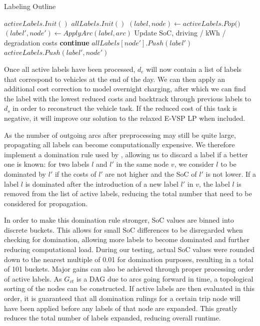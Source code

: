 \documentclass[]{article}
\begin{document}
\begin{algorithm}
\caption{Labeling Outline}\label{alg:evsp-labeling}
\begin{algorithmic}
\State $activeLabels.Init()$ 
\State $allLabels.Init()$ 
    \State $(label, node) \gets \textit{activeLabels.Pop()}$
        \State $(label', node') \gets ApplyArc(label, arc)$ \Comment Update SoC, driving / kWh / degradation costs
          \textbf{continue}
        \EndIf
        \State $allLabels[node'].Push(label')$
          \State $activeLabels.Push(label', node')$
        \EndIf
    \EndFor
\EndWhile
\end{algorithmic}
\end{algorithm}
Once all active labels have been processed, $d_e$ will now contain a list of labels that correspond to vehicles at the end of the day. We can then apply an additional cost correction to model overnight charging, after which we can find the label with the lowest reduced costs and backtrack through previous labels to $d_s$ in order to reconstruct the vehicle task. If the reduced cost of this task is negative, it will improve our solution to the relaxed E-VSP LP when included. 

As the number of outgoing arcs after preprocessing may still be quite large, propagating all labels can become computationally expensive. We therefore implement a domination rule used by \citet{Huang2016}, allowing us to discard a label if a better one is known: for two labels $l$ and $l'$ in the same node $v$, we consider $l$ to be dominated by $l'$ if the costs of $l'$ are not higher and the SoC of $l'$ is not lower. If a label $l$ is dominated after the introduction of a new label $l'$ in $v$, the label $l$ is removed from the list of active labels, reducing the total number that need to be considered for propagation.

In order to make this domination rule stronger, SoC values are binned into discrete buckets. This allows for small SoC differences to be disregarded when checking for domination, allowing more labels to become dominated and further reducing computational load. During our testing, actual SoC values were rounded down to the nearest multiple of 0.01 for domination purposes, resulting in a total of 101 buckets. Major gains can also be achieved through proper processing order of active labels. As $G_{vt}$ is a DAG due to arcs going forward in time, a topological sorting of the nodes can be constructed. If active labels are then evaluated in this order, it is guaranteed that all domination rulings for a certain trip node will have been applied before any labels of that node are expanded. This greatly reduces the total number of labels expanded, reducing overall runtime.
\end{document}
